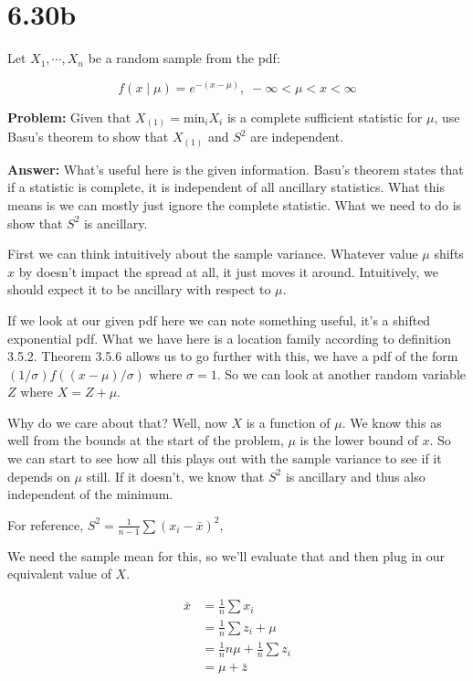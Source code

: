 \section*{6.30b}

Let $X_1, \cdots, X_n$ be a random sample from the pdf:

\[
	f(x \mid \mu) = e^{-(x-\mu)}, \; -\infty < \mu < x < \infty
\]

\textbf{Problem:} Given that $X_{(1)} = \text{min}_iX_i$ is a complete sufficient statistic for $\mu$, use Basu's theorem to show that $X_{(1)}$ and $S^2$ are independent.

\textbf{Answer:} What's useful here is the given information. Basu's theorem states that if a statistic is complete, it is independent of all ancillary statistics. What this means is we can mostly just ignore the complete statistic. What we need to do is show that $S^2$ is ancillary. 

First we can think intuitively about the sample variance. Whatever value $\mu$ shifts $x$ by doesn't impact the spread at all, it just moves it around. Intuitively, we should expect it to be ancillary with respect to $\mu$.  

If we look at our given pdf here we can note something useful, it's a shifted exponential pdf. What we have here is a location family according to definition 3.5.2. Theorem 3.5.6 allows us to go further with this, we have a pdf of the form $(1/\sigma) f( (x-\mu)/\sigma )$ where $\sigma=1$. So we can look at another random variable $Z$ where $X=Z+\mu$. 

Why do we care about that? Well, now $X$ is a function of $\mu$. We know this as well from the bounds at the start of the problem, $\mu$ is the lower bound of $x$. So we can start to see how all this plays out with the sample variance to see if it depends on $\mu$ still. If it doesn't, we know that $S^2$ is ancillary and thus also independent of the minimum. 

For reference, $S^2 = \frac{1}{n-1} \sum (x_i - \bar{x})^2$,

We need the sample mean for this, so we'll evaluate that and then plug in our equivalent value of $X$. 

\begin{align*}
	\bar{x} &= \frac{1}{n} \sum x_i \\
	&= \frac{1}{n} \sum z_i + \mu \\
	&= \frac{1}{n} n\mu + \frac{1}{n} \sum z_i \\
	&= \mu + \bar{z}
\end{align*}

